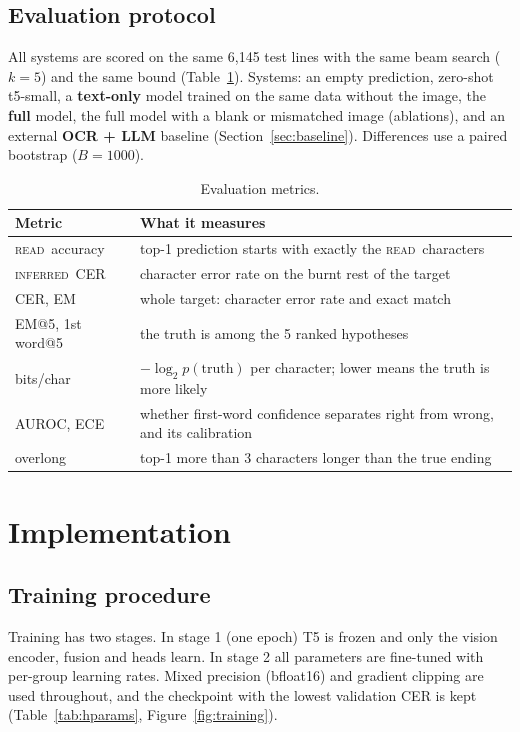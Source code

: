 \documentclass[12pt,a4paper,oneside]{report}
\newcommand{\READ}{\texorpdfstring{\textsc{read}}{READ}}
\newcommand{\INF}{\texorpdfstring{\textsc{inferred}}{INFERRED}}
\begin{document}
\section{Evaluation protocol}
All systems are scored on the same 6{,}145 test lines with the same beam search ($k=5$) and the same
bound (Table~\ref{tab:metrics}). Systems: an empty prediction, zero-shot t5-small, a \textbf{text-only}
model trained on the same data without the image, the \textbf{full} model, the full model with a
blank or mismatched image (ablations), and an external \textbf{OCR + LLM} baseline
(Section~\ref{sec:baseline}). Differences use a paired bootstrap ($B=1000$).

\begin{table}[H]
\centering\small
\caption{Evaluation metrics.}\label{tab:metrics}
\begin{tabularx}{\linewidth}{@{}lX@{}}
\toprule
Metric & What it measures\\
\midrule
\READ\ accuracy & top-1 prediction starts with exactly the \READ\ characters\\
\INF\ CER & character error rate on the burnt rest of the target\\
CER, EM & whole target: character error rate and exact match\\
EM@5, 1st word@5 & the truth is among the 5 ranked hypotheses\\
bits/char & $-\log_2 p(\text{truth})$ per character; lower means the truth is more likely\\
AUROC, ECE & whether first-word confidence separates right from wrong, and its calibration\\
overlong & top-1 more than 3 characters longer than the true ending\\
\bottomrule
\end{tabularx}
\end{table}

\chapter{Implementation}\label{ch:impl}
\section{Training procedure}
Training has two stages. In stage 1 (one epoch) T5 is frozen and only the vision encoder, fusion and
heads learn. In stage 2 all parameters are fine-tuned with per-group learning rates. Mixed precision
(bfloat16) and gradient clipping are used throughout, and the checkpoint with the lowest validation
CER is kept (Table~\ref{tab:hparams}, Figure~\ref{fig:training}).
\end{document}
